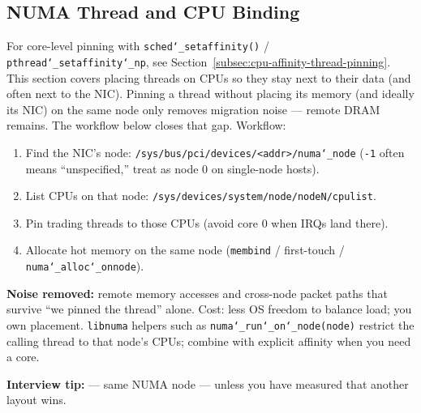 \subsection{NUMA Thread and CPU Binding}
\label{subsec:numa-thread-cpu-binding}
For core-level pinning with \texttt{sched\char`_setaffinity()} / \texttt{pthread\char`_setaffinity\char`_np}, 
see Section~\ref{subsec:cpu-affinity-thread-pinning}. 
This section covers placing threads on CPUs  so they stay next 
to their data (and often next to the NIC).
\newline
Pinning a thread without placing its memory (and ideally its NIC) on the same node only 
removes migration noise --- remote DRAM remains. The workflow below closes that gap.
\newline
Workflow:
\begin{enumerate}
    \item Find the NIC's node: \texttt{/sys/bus/pci/devices/<addr>/numa\char`_node} 
          (\texttt{-1} often means ``unspecified,'' treat as node 0 on single-node hosts).
    \item List CPUs on that node: \texttt{/sys/devices/system/node/nodeN/cpulist}.
    \item Pin trading threads to those CPUs (avoid core 0 when IRQs land there).
    \item Allocate hot memory on the same node (\texttt{membind} / first-touch / \texttt{numa\char`_alloc\char`_onnode}).
\end{enumerate}
\textbf{Noise removed:} remote memory accesses and cross-node packet paths that survive 
``we pinned the thread'' alone. Cost: less OS freedom to balance load; you own placement.
\newline
\texttt{libnuma} helpers such as \texttt{numa\char`_run\char`_on\char`_node(node)} restrict the calling 
thread to that node's CPUs; combine with explicit affinity when you need a  core.
\par\noindent\textbf{Interview tip:}  --- same NUMA node --- 
unless you have measured that another layout wins.
